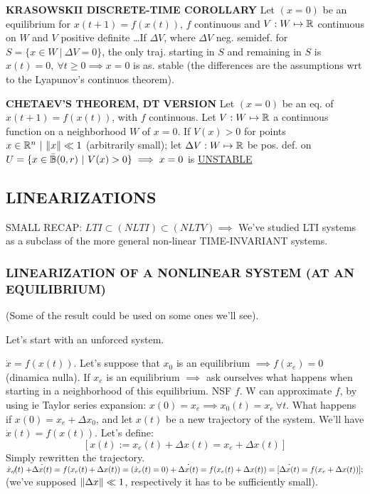 \begin{thrm}{\textbf{KRASOWSKII DISCRETE-TIME COROLLARY}} \newline
Let $(x=0)$ be an equilibrium for $x(t+1)=f(x(t))$, $f$ continuous and $V:W\mapsto \mathbb{R}$ continuous on $W$ and $V$ positive definite \dots If $\Delta V$, where $\Delta V$ neg. semidef. for $S=\{x \in W\ |\ \Delta V = 0\}$, the only traj. starting in $S$ and remaining in $S$ is $x(t)=0,\ \forall t \geq 0 \implies x=0$ is as. stable (the differences are the assumptions wrt to the Lyapunov's continuos theorem). 
\end{thrm}

\begin{thrm}{\textbf{CHETAEV'S THEOREM, DT VERSION}}
Let $(x=0)$ be an eq. of $x(t+1)=f(x(t))$, with $f$ continuous. Let $V:W \mapsto \mathbb{R}$ a continuous function on a neighborhood $W$ of $x=0$. If $V(x)>0$ for points $x \in \mathbb{R}^n\ |\ \lVert x\rVert \ll 1$ (arbitrarily small); let $\Delta V:W \mapsto \mathbb{R}$ be pos. def. on $U=\{x \in \bar{\mathbb{B}}(0,r)\ |\ V(x) > 0\} \implies x=0$ is \underline{UNSTABLE}
\end{thrm}

\subsection{LINEARIZATIONS}

SMALL RECAP: $LTI \subset (NLTI) \subset (NLTV) \implies$ We've studied LTI systems as a subclass of the more general non-linear TIME-INVARIANT systems.

\subsubsection{LINEARIZATION OF A NONLINEAR SYSTEM (AT AN EQUILIBRIUM)}
(Some of the result could be used on some ones we'll see).

Let's start with an unforced system.

$\dot{x}=f(x(t))$. Let's suppose that $x_0$ is an equilibrium $\implies f(x_e) = 0$ (dinamica nulla). If $x_e$ is an equilibrium $\implies$ ask ourselves what happens when starting in a neighborhood of this equilibrium. NSF $f$. W can approximate $f$, by using ie Taylor series expansion:
$x(0)=x_e \implies x_0(t)=x_e\ \forall t$. What happens if $x(0)=x_e+\Delta x_0$, and let $x(t)$ be a new trajectory of the system. We'll have $\dot{x}(t) = f(x(t))$. Let's define:
\[
	[x(t) := x_e(t) + \Delta x(t) = x_e + \Delta x(t)]
\]
Simply rewritten the trajectory. $\centernot{\dot{x}_e(t)} + \dot{\Delta x(t)} = f(x_e(t) + \Delta x(t)) = (\dot{x}_e(t) = 0) + \dot{\Delta x(t)} = f(x_e(t)+\Delta x(t)) = [\dot{\Delta x(t)} = f(x_e + \Delta x(t))];$ (we've supposed $\lVert\Delta x\rVert \ll 1$, respectively it has to be sufficiently small).

